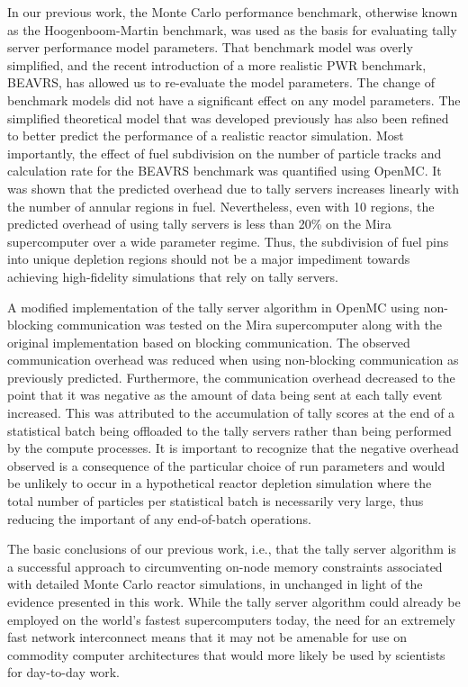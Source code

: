 \documentclass{snamc2013}
\begin{document}
In our previous work, the Monte Carlo performance benchmark, otherwise known as
the Hoogenboom-Martin benchmark, was used as the basis for evaluating tally
server performance model parameters. That benchmark model was overly simplified,
and the recent introduction of a more realistic PWR benchmark, BEAVRS, has
allowed us to re-evaluate the model parameters. The change of benchmark models
did not have a significant effect on any model parameters. The simplified
theoretical model that was developed previously has also been refined to better
predict the performance of a realistic reactor simulation. Most importantly, the
effect of fuel subdivision on the number of particle tracks and calculation rate
for the BEAVRS benchmark was quantified using OpenMC. It was shown that the
predicted overhead due to tally servers increases linearly with the number of
annular regions in fuel. Nevertheless, even with 10 regions, the predicted
overhead of using tally servers is less than 20\% on the Mira supercomputer over
a wide parameter regime. Thus, the subdivision of fuel pins into unique
depletion regions should not be a major impediment towards achieving
high-fidelity simulations that rely on tally servers.

A modified implementation of the tally server algorithm in OpenMC using
non-blocking communication was tested on the Mira supercomputer along with the
original implementation based on blocking communication. The observed
communication overhead was reduced when using non-blocking communication as
previously predicted. Furthermore, the communication overhead decreased to the
point that it was negative as the amount of data being sent at each tally event
increased. This was attributed to the accumulation of tally scores at the end of
a statistical batch being offloaded to the tally servers rather than being
performed by the compute processes. It is important to recognize that the
negative overhead observed is a consequence of the particular choice of run
parameters and would be unlikely to occur in a hypothetical reactor depletion
simulation where the total number of particles per statistical batch is
necessarily very large, thus reducing the important of any end-of-batch
operations.

The basic conclusions of our previous work, i.e., that the tally server
algorithm is a successful approach to circumventing on-node memory constraints
associated with detailed Monte Carlo reactor simulations, in unchanged in light
of the evidence presented in this work. While the tally server algorithm could
already be employed on the world's fastest supercomputers today, the need for an
extremely fast network interconnect means that it may not be amenable for use on
commodity computer architectures that would more likely be used by scientists
for day-to-day work.
\end{document}
